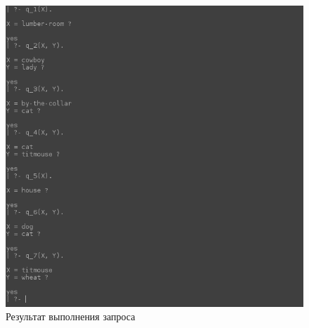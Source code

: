 \begin{figure}[h!]
  \centering
  \includegraphics[width=130mm]{img/q}
  \caption{Результат выполнения запроса}
  \label{fig:q}
\end{figure}

\newpage